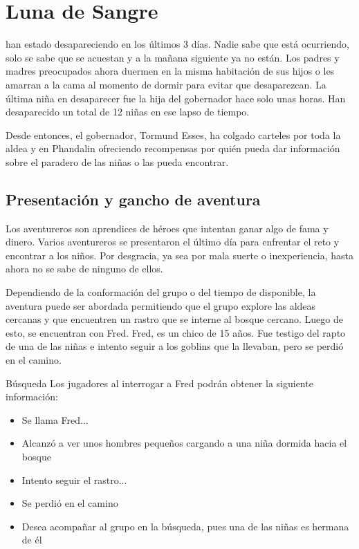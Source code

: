 \documentclass[10pt,twoside,twocolumn,openany]{dndbook}
\begin{document}
\chapter*{Luna de Sangre}

 han estado desapareciendo en los 
últimos 3 días. Nadie sabe que está ocurriendo, solo se sabe que se acuestan y a la mañana 
siguiente ya no están. Los padres y madres preocupados ahora duermen en la misma habitación de
sus hijos o les amarran a la cama al momento de dormir para evitar que desaparezcan. La última 
niña en desaparecer fue la hija del gobernador hace solo unas horas. Han desaparecido un total de 
12 niñas en ese lapso de tiempo.

Desde entonces, el gobernador, Tormund Esses, ha colgado carteles por toda la aldea y en Phandalin 
ofreciendo recompensas por quién pueda dar información sobre el paradero de las niñas o las pueda 
encontrar.

\section{Presentación y gancho de aventura}

Los aventureros son aprendices de héroes que intentan ganar algo de fama y dinero. Varios aventureros 
se presentaron el último día para enfrentar el reto y encontrar a los niños. Por desgracia, ya sea 
por mala suerte o inexperiencia, hasta ahora no se sabe de ninguno de ellos.

Dependiendo de la conformación del grupo o del tiempo de disponible, la aventura puede ser abordada
permitiendo que el grupo explore las aldeas cercanas y que encuentren un rastro que se interne al 
bosque cercano. Luego de esto, se encuentran con Fred. Fred, es un chico de 15 años. Fue testigo 
del rapto de una de las niñas e intento seguir a los goblins que la llevaban, pero se perdió en 
el camino.

\begin{DndComment}{Búsqueda}
  Los jugadores al interrogar a Fred podrán obtener la siguiente información:

  \begin{itemize}
    \item Se llama Fred...
    \item Alcanzó a ver unos hombres pequeños cargando a una niña dormida hacia el bosque
    \item Intento seguir el rastro...
    \item Se perdió en el camino
    \item Desea acompañar al grupo en la búsqueda, pues una de las niñas es hermana de él
  \end{itemize}
  
\end{DndComment}
\end{document}
